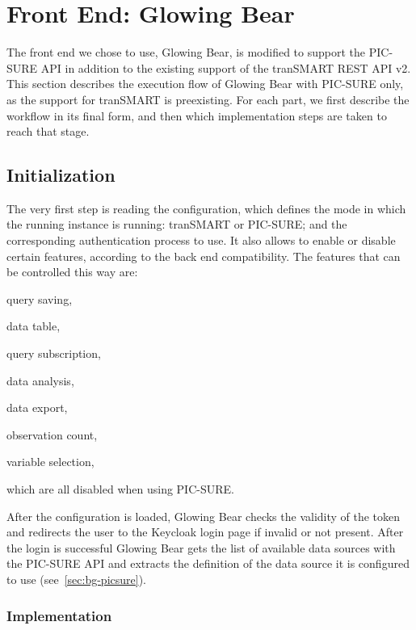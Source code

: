 \section{Front End: Glowing Bear}
\label{sec:interoplayer-gb}

The front end we chose to use, Glowing Bear, is modified to support the PIC-SURE API in addition to the existing support of the tranSMART REST API v2.
This section describes the execution flow of Glowing Bear with PIC-SURE only, as the support for tranSMART is preexisting.
For each part, we first describe the workflow in its final form, and then which implementation steps are taken to reach that stage.

\subsection{Initialization}

The very first step is reading the configuration, which defines the mode in which the running instance is running: tranSMART or PIC-SURE; and the corresponding authentication process to use.
It also allows to enable or disable certain features, according to the back end compatibility.
The features that can be controlled this way are:
\begin{enumerate*}
    \item query saving,
    \item data table,
    \item query subscription,
    \item data analysis,
    \item data export,
    \item observation count,
    \item variable selection,
\end{enumerate*}
which are all disabled when using PIC-SURE.

After the configuration is loaded, Glowing Bear checks the validity of the token and redirects the user to the Keycloak login page if invalid or not present.
After the login is successful Glowing Bear gets the list of available data sources with the PIC-SURE API and extracts the definition of the data source it is configured to use (see~\ref{sec:bg-picsure}).


\subsubsection{Implementation}

